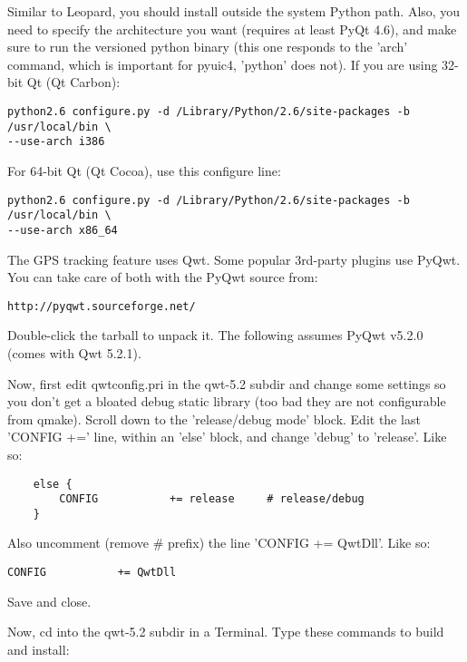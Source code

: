 Similar to Leopard, you should install outside the system Python path.
Also, you need to specify the architecture you want (requires at least PyQt 4.6),
and make sure to run the versioned python binary (this one responds to the
'arch' command, which is important for pyuic4, 'python' does not).
If you are using 32-bit Qt (Qt Carbon):

\begin{verbatim}
python2.6 configure.py -d /Library/Python/2.6/site-packages -b /usr/local/bin \
--use-arch i386
\end{verbatim}

For 64-bit Qt (Qt Cocoa), use this configure line:

\begin{verbatim}
python2.6 configure.py -d /Library/Python/2.6/site-packages -b /usr/local/bin \
--use-arch x86_64
\end{verbatim}

\hypertarget{toc31}{}
The GPS tracking feature uses Qwt.  Some popular 3rd-party plugins use PyQwt.
You can take care of both with the PyQwt source from:

\begin{verbatim}
http://pyqwt.sourceforge.net/
\end{verbatim}

Double-click the tarball to unpack it.  The following assumes PyQwt v5.2.0 (comes with Qwt 5.2.1).

Now, first edit qwtconfig.pri in the qwt-5.2 subdir and change some settings so
you don't get a bloated debug static library (too bad they are not configurable from
qmake).  Scroll down to the 'release/debug mode' block.  Edit the last 'CONFIG +='
line, within an 'else' block, and change 'debug' to 'release'.  Like so:

\begin{verbatim}
    else {
        CONFIG           += release     # release/debug
    }
\end{verbatim}

Also uncomment (remove \# prefix) the line 'CONFIG += QwtDll'.  Like so:

\begin{verbatim}
CONFIG           += QwtDll
\end{verbatim}

Save and close.

Now, cd into the qwt-5.2 subdir in a Terminal.  Type these commands to build and install:

